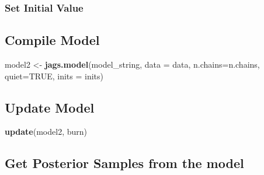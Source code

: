 \documentclass[
]{article}
\newenvironment{Shaded}{\begin{snugshade}}{\end{snugshade}}
\newcommand{\AttributeTok}[1]{\textcolor[rgb]{0.13,0.29,0.53}{#1}}
\newcommand{\ConstantTok}[1]{\textcolor[rgb]{0.56,0.35,0.01}{#1}}
\newcommand{\ControlFlowTok}[1]{\textcolor[rgb]{0.13,0.29,0.53}{\textbf{#1}}}
\newcommand{\DecValTok}[1]{\textcolor[rgb]{0.00,0.00,0.81}{#1}}
\newcommand{\FunctionTok}[1]{\textcolor[rgb]{0.13,0.29,0.53}{\textbf{#1}}}
\newcommand{\NormalTok}[1]{#1}
\newcommand{\OtherTok}[1]{\textcolor[rgb]{0.56,0.35,0.01}{#1}}
\newcommand{\SpecialCharTok}[1]{\textcolor[rgb]{0.81,0.36,0.00}{\textbf{#1}}}
\begin{document}
\subsubsection{Set Initial Value}\label{set-initial-value-1}

\begin{Shaded}
\end{Shaded}

\subsection{Compile Model}\label{compile-model-1}

\begin{Shaded}
\begin{Highlighting}[]
\NormalTok{model2 }\OtherTok{\textless{}{-}} \FunctionTok{jags.model}\NormalTok{(model\_string, }\AttributeTok{data =}\NormalTok{ data, }\AttributeTok{n.chains=}\NormalTok{n.chains, }\AttributeTok{quiet=}\ConstantTok{TRUE}\NormalTok{, }\AttributeTok{inits =}\NormalTok{ inits)}
\end{Highlighting}
\end{Shaded}

\subsection{Update Model}\label{update-model-1}

\begin{Shaded}
\begin{Highlighting}[]
\FunctionTok{update}\NormalTok{(model2, burn)}
\end{Highlighting}
\end{Shaded}

\subsection{Get Posterior Samples from the
model}\label{get-posterior-samples-from-the-model-1}
\end{document}
